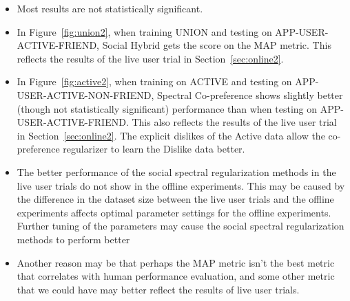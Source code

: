 \begin{itemize}
\item{Most results are not statistically significant.}

\item{In Figure~\ref{fig:union2}, when training UNION and testing on APP-USER-ACTIVE-FRIEND, Social Hybrid gets the score on the MAP metric. This reflects the results of the live user trial in Section~\ref{sec:online2}.}

\item{ In Figure~\ref{fig:active2}, when training on ACTIVE and testing on APP-USER-ACTIVE-NON-FRIEND, Spectral Co-preference shows slightly better (though not statistically significant) performance than when testing on APP-USER-ACTIVE-FRIEND. This also reflects the results of the live user trial in Section~\ref{sec:online2}. The explicit dislikes of the Active data allow the co-preference regularizer to learn the Dislike data better.}

\item{The better performance of the social spectral regularization methods in the live user trials do not show in the offline experiments. This may be caused by the difference in the dataset size between the live user trials and the offline experiments affects optimal parameter settings for the offline experiments. Further tuning of the parameters may cause the social spectral regularization methods to perform better}

\item{Another reason may be that perhaps the MAP metric isn't the best metric that correlates with human performance evaluation, and some other metric that we could have may better reflect the results of live user trials.}
\end{itemize}


